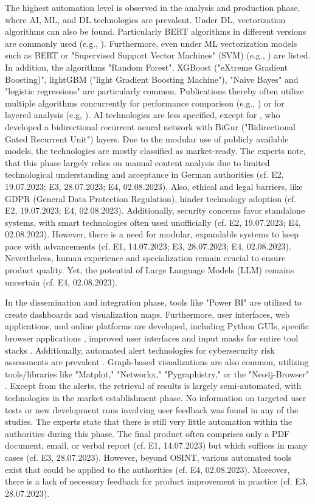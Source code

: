 \documentclass[10pt]{article}
\begin{document}
The highest automation level is observed in the analysis and production phase, where AI, ML, and DL technologies are prevalent.
Under DL, vectorization algorithms can also be found. Particularly BERT algorithms in different versions are commonly used
(e.g., \cite{Ma.2022}). Furthermore, even under ML vectorization models such as BERT or
"Supervised Support Vector Machines" (SVM) (e.g., \cite{Iorga.2020}) are listed.
In addition, the algorithms "Random Forest", XGBoost ("eXtreme Gradient Boosting)",
lightGBM ("light Gradient Boosting Machine"), "Naive Bayes" and "logistic regressions" are particularly common.
Publications thereby often utilize multiple algorithms concurrently for performance comparison (e.g., \cite{Tao.2023})
or for layered analysis (e.g, \cite{Yang.2022}). AI technologies are less specified,
except for \cite{Dale.2023}, who developed a bidirectional recurrent neural network with
BiGur ("Bidirectional Gated Recurrent Unit") layers. Due to the modular use of publicly available models,
the technologies are mostly classified as market-ready. The experts note, that this phase largely relies
on manual content analysis due to limited technological understanding and acceptance in German authorities
(cf. E2, 19.07.2023; E3, 28.07.2023; E4, 02.08.2023). Also, ethical and legal barriers, like GDPR (General Data Protection Regulation), hinder technology
adoption (cf. E2, 19.07.2023; E4, 02.08.2023). Additionally, security concerns favor standalone systems,
with smart technologies often used unofficially (cf. E2, 19.07.2023; E4, 02.08.2023). However, there is a need for modular,
expandable systems to keep pace with advancements (cf. E1, 14.07.2023; E3, 28.07.2023; E4, 02.08.2023). Nevertheless, human experience
and specialization remain crucial to ensure product quality. Yet, the potential of Large Language Models (LLM) remains uncertain (cf. E4, 02.08.2023).

In the dissemination and integration phase, tools like "Power BI" \cite{Tao.2023}
are utilized to create dashboards and visualization maps. Furthermore, user interfaces,
web applications, and online platforms are developed, including Python GUIs,
specific browser applications \cite{Elmas.2022},
improved user interfaces and input masks for entire tool stacks \cite{Arjun.2020}.
Additionally, automated alert technologies for cybersecurity risk assessments are prevalent \cite{Ahuja.2022}. Graph-based visualizations are also common, utilizing tools/libraries like "Matplot," "Networkx," "Pygraphistry," or the "Neo4j-Browser" \cite{Middleton.2020}.
Except from the alerts, the retrieval of results is largely semi-automated, with technologies in the market establishment phase. No information on targeted user tests or new development runs involving user feedback was found in any of the studies. The experts state that there is still very little
automation within the authorities during this phase. The final product often comprises only a PDF document, email, or verbal report (cf. E1, 14.07.2023) but which suffices in many cases (cf. E3, 28.07.2023).
However, beyond OSINT, various automated tools exist that could be applied to the authorities (cf. E4, 02.08.2023). Moreover, there is a lack of necessary feedback for product improvement in practice (cf. E3, 28.07.2023).
\end{document}
